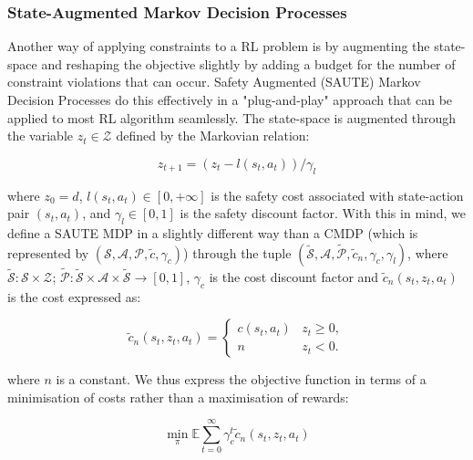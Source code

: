 \documentclass[12pt,twoside]{report}
\begin{document}
\subsubsection{State-Augmented Markov Decision Processes}

Another way of applying constraints to a RL problem is by augmenting the state-space and reshaping the objective slightly by adding a budget for the number of constraint violations that can occur. Safety Augmented (SAUTE) Markov Decision Processes \cite{saute} do this effectively in a "plug-and-play" approach that can be applied to most RL algorithm seamlessly. The state-space is augmented through the variable $z_t \in \mathcal{Z}$ defined by the Markovian relation: 

\begin{equation}
    z_{t+1} = (z_t - l(s_t, a_t))/\gamma_l
\end{equation}

\noindent where $z_0 = d$, $l(s_t,a_t) \in [0,+\infty]$ is the safety cost associated with state-action pair $(s_t,a_t)$, and $\gamma_l \in [0,1]$ is the safety discount factor. With this in mind, we define a SAUTE MDP in a slightly different way than a CMDP (which is represented by $(\mathcal{S}, \mathcal{A}, \mathcal{P}, \tilde{c}, \gamma_c)$) through the tuple $(\tilde{\mathcal{S}}, \mathcal{A}, \tilde{\mathcal{P}}, \tilde{c}_n, \gamma_c, \gamma_l)$, where $\tilde{\mathcal{S}}: \mathcal{S} \times \mathcal{Z}$; $\tilde{\mathcal{P}}: \tilde{\mathcal{S}} \times \mathcal{A} \times \tilde{\mathcal{S}} \longrightarrow [0,1]$, $\gamma_c$ is the cost discount factor and $\tilde{c}_n (s_t, z_t, a_t)$ is the cost expressed as: 

\begin{equation}
    \tilde{c}_n (s_t, z_t, a_t) = 
    \begin{cases}
        c(s_t, a_t) & z_t \geq 0, \\
        n & z_t < 0.
    \end{cases}
\end{equation}

\noindent where $n$ is a constant. We thus express the objective function in terms of a minimisation of costs rather than a maximisation of rewards: 

\begin{equation}
    \min_\pi \mathbb{E} \sum_{t=0}^{\infty} \gamma_c^t \tilde{c}_n (s_t, z_t, a_t)
\end{equation}
\end{document}
